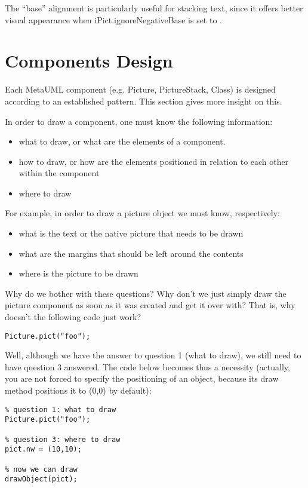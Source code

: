 \documentclass{article}
\newcommand{\code}{\ttfamily}
\begin{document}
The ``{\code base}'' alignment is particularly useful for stacking text, since it
offers better visual appearance when {\code iPict.ignoreNegativeBase} is set to {\code 1}.

\section{Components Design}

Each MetaUML component (e.g. {\code Picture}, {\code PictureStack}, {\code Class}) is
designed according to an established pattern. This section gives more insight
on this.

In order to draw a component, one must know the following information:
\begin{itemize}
\item what to draw, or what are the elements of a component.
\item how to draw, or how are the elements positioned in relation to each other within the component
\item where to draw
\end{itemize}

For example, in order to draw a picture object we must know, respectively:
\begin{itemize}
\item what is the text or the native picture that needs to be drawn
\item what are the margins that should be left around the contents
\item where is the picture to be drawn
\end{itemize}

Why do we bother with these questions? Why don't we just simply draw the picture
component as soon as it was created and get it over with?
That is, why doesn't the following code just work?

\begin{verbatim}
Picture.pict("foo");
\end{verbatim}

Well, although we have the answer to question 1 (what to draw),
we still need to have question 3 answered. The code below becomes thus a
necessity (actually, you are not forced to specify the positioning of an object,
because its draw method positions it to {\code (0,0)} by default):

\begin{verbatim}
% question 1: what to draw
Picture.pict("foo");

% question 3: where to draw
pict.nw = (10,10);

% now we can draw
drawObject(pict);
\end{verbatim}
\end{document}
